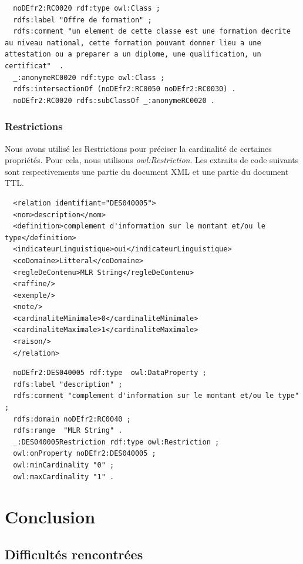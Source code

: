 \documentclass[11pt]{report}
\begin{document}
\begin{lstlisting}
  noDEfr2:RC0020 rdf:type owl:Class ;
  rdfs:label "Offre de formation" ;
  rdfs:comment "un element de cette classe est une formation decrite au niveau national, cette formation pouvant donner lieu a une attestation ou a preparer a un diplome, une qualification, un certificat"  .
  _:anonymeRC0020 rdf:type owl:Class ;
  rdfs:intersectionOf (noDEfr2:RC0050 noDEfr2:RC0030) .
  noDEfr2:RC0020 rdfs:subClassOf _:anonymeRC0020 .
\end{lstlisting}

\subsection{Restrictions}

Nous avons utilisé les Restrictions pour préciser la cardinalité de certaines propriétés. Pour cela, nous utilisons \emph{owl:Restriction}.
\hfill \break
\hfill \break
Les extraits de code suivants sont respectivements une partie du document XML et une partie du document TTL.
\begin{lstlisting}
  <relation identifiant="DES040005">
  <nom>description</nom>
  <definition>complement d'information sur le montant et/ou le type</definition>
  <indicateurLinguistique>oui</indicateurLinguistique>
  <coDomaine>Litteral</coDomaine>
  <regleDeContenu>MLR String</regleDeContenu>
  <raffine/>
  <exemple/>
  <note/>
  <cardinaliteMinimale>0</cardinaliteMinimale>
  <cardinaliteMaximale>1</cardinaliteMaximale>
  <raison/>
  </relation>
\end{lstlisting}

\begin{lstlisting}
  noDEfr2:DES040005 rdf:type  owl:DataProperty ;
  rdfs:label "description" ;
  rdfs:comment "complement d'information sur le montant et/ou le type" ;
  rdfs:domain noDEfr2:RC0040 ;
  rdfs:range  "MLR String" .
  _:DES040005Restriction rdf:type owl:Restriction ;
  owl:onProperty noDEfr2:DES040005 ;
  owl:minCardinality "0" ;
  owl:maxCardinality "1" .
\end{lstlisting}

\chapter{Conclusion}

\section{Difficultés rencontrées}
\end{document}
